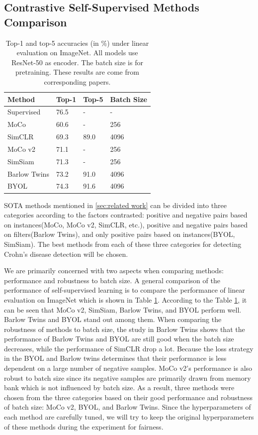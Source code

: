 \documentclass[conference]{IEEEtran}
\begin{document}
\subsection{Contrastive Self-Supervised Methods Comparison}

\begin{table}[tb]
\caption{Top-1 and top-5 accuracies (in \%) under linear evaluation on ImageNet. All models use ResNet-50 as encoder. The batch size is for pretraining. These results are come from corresponding papers.}
\centering
\begin{tabular}{llll}
\hline
Method      & Top-1 & Top-5 & Batch Size \\ \hline
Supervised  & 76.5  & -     & -          \\ \hline
MoCo        & 60.6  & -     & 256        \\
SimCLR      & 69.3  & 89.0  & 4096       \\
MoCo v2     & 71.1  & -     & 256        \\
SimSiam     & 71.3  & -     & 256        \\
Barlow Twins & 73.2  & 91.0  & 4096       \\
BYOL        & 74.3  & 91.6  & 4096       \\
 \hline
\end{tabular}
\label{tab；methods_comparison_linear_evaluation}
\end{table}
SOTA methods mentioned in \ref{sec:related work} can be divided into three categories according to the factors contrasted: positive and negative pairs based on instances(MoCo, MoCo v2, SimCLR, etc.), positive and negative pairs based on filters(Barlow Twins), and only positive pairs based on instances(BYOL, SimSiam). The best methods from each of these three categories for detecting Crohn's disease detection will be chosen.

We are primarily concerned with two aspects when comparing methods: performance and robustness to batch size.
A general comparison of the performance of self-supervised learning is to compare the performance of linear evaluation on ImageNet which is shown in Table \ref{tab；methods_comparison_linear_evaluation}. According to the Table \ref{tab；methods_comparison_linear_evaluation}, it can be seen that MoCo v2, SimSiam, Barlow Twins, and BYOL perform well. Barlow Twins and BYOL stand out among them.
When comparing the robustness of methods to batch size, the study\cite{BarlowTwins} in Barlow Twins shows that the performance of Barlow Twins and BYOL are still good when the batch size decreases, while the performance of SimCLR drop a lot. Because the loss strategy in the BYOL and Barlow twins determines that their performance is less dependent on a large number of negative samples.
MoCo v2's performance is also robust to batch size since its negative samples are primarily drawn from memory bank which is not influenced by batch size. 
As a result, three methods were chosen from the three categories based on their good performance and robustness of batch size: MoCo v2, BYOL, and Barlow Twins. Since the hyperparameters of each method are carefully tuned, we will try to keep the original hyperparameters of these methods during the experiment for fairness.
\end{document}
